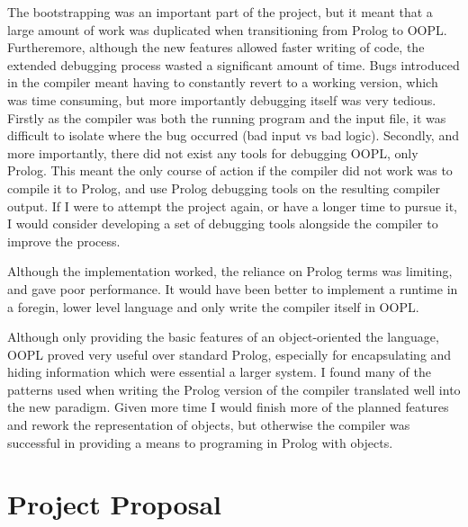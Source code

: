 \documentclass[12pt,a4paper,twoside,openright]{report}
\begin{document}
\bigskip

The bootstrapping was an important part of the project, but it meant that a large amount of work was duplicated when transitioning from Prolog to OOPL. Furtheremore, although the new features allowed faster writing of code, the extended debugging process wasted a significant amount of time. Bugs introduced in the compiler meant having to constantly revert to a working version, which was time consuming, but more importantly debugging itself was very tedious. Firstly as the compiler was both the running program and the input file, it was difficult to isolate where the bug occurred (bad input vs bad logic). Secondly, and more importantly, there did not exist any tools for debugging OOPL, only Prolog. This meant the only course of action if the compiler did not work was to compile it to Prolog, and use Prolog debugging tools on the resulting compiler output. If I were to attempt the project again, or have a longer time to pursue it, I would consider developing a set of debugging tools alongside the compiler to improve the process.

\bigskip

Although the implementation worked, the reliance on Prolog terms was limiting, and gave poor performance. It would have been better to implement a runtime in a foregin, lower level language and only write the compiler itself in OOPL.

\bigskip

Although only providing the basic features of an object-oriented the language, OOPL proved very useful over standard Prolog, especially for encapsulating and hiding information which were essential a larger system. I found many of the patterns used when writing the Prolog version of the compiler translated well into the new paradigm. Given more time I would finish more of the planned features and rework the representation of objects, but otherwise the compiler was successful in providing a means to programing in Prolog with objects.

{}


\appendix


\chapter{Project Proposal}
\end{document}

